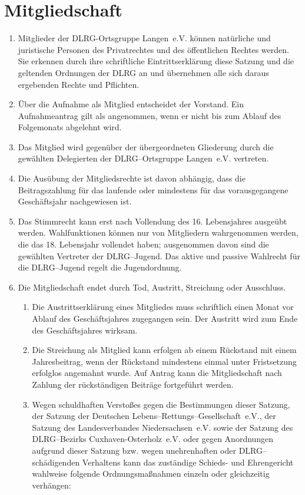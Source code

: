 \documentclass[%
12pt, %
a4paper, %
headsepline, %
footsepline, %
parskip, %
headings=normal, %
]{scrartcl}
\begin{document}
\section{Mitgliedschaft}
\label{sec:mitgliedschaft}
\begin{enumerate}
    \item Mitglieder der DLRG-Ortsgruppe Langen~e.V. können natürliche und juristische Personen des Privatrechtes und des öffentlichen Rechtes werden. Sie erkennen durch ihre schriftliche Eintrittserklärung diese Satzung und die geltenden Ordnungen der DLRG an und übernehmen alle sich daraus ergebenden Rechte und Pflichten.
    \item Über die Aufnahme als Mitglied entscheidet der Vorstand. Ein Aufnahmeantrag gilt als angenommen, wenn er nicht bis zum Ablauf des Folgemonats abgelehnt wird.
    \item Das Mitglied wird gegenüber der übergeordneten Gliederung durch die gewählten Delegierten der DLRG--Ortsgruppe Langen~e.V. vertreten.
    \item Die Ausübung der Mitgliedsrechte ist davon abhängig, dass die Beitragszahlung für das laufende oder mindestens für das vorausgegangene Geschäftsjahr nachgewiesen ist.
    \item Das Stimmrecht kann erst nach Vollendung des 16. Lebensjahres ausgeübt werden. Wahlfunktionen können nur von Mitgliedern wahrgenommen werden, die das 18. Lebensjahr vollendet haben; ausgenommen davon sind die gewählten Vertreter der DLRG--Jugend. Das aktive und passive Wahlrecht für die DLRG--Jugend regelt die Jugendordnung.
    \item Die Mitgliedschaft endet durch Tod, Austritt, Streichung oder Ausschluss.\begin{enumerate}[noitemsep]
        \item Die Austrittserklärung eines Mitgliedes muss schriftlich einen Monat vor Ablauf des Geschäftsjahres zugegangen sein. Der Austritt wird zum Ende des Geschäftsjahres wirksam.
        \item Die Streichung als Mitglied kann erfolgen ab einem Rückstand mit einem Jahresbeitrag, wenn der Rückstand mindestens einmal unter Fristsetzung erfolglos angemahnt wurde. Auf Antrag kann die Mitgliedschaft nach Zahlung der rückständigen Beiträge fortgeführt werden.
        \item Wegen schuldhaften Verstoßes gegen die Bestimmungen dieser Satzung, der Satzung der Deutschen Lebens--Rettungs--Gesellschaft~e.V., der Satzung des Landesverbandes Niedersachsen~e.V. sowie der Satzung des DLRG--Bezirks Cuxhaven-Osterholz~e.V. oder gegen Anordnungen aufgrund dieser Satzung bzw. wegen unehrenhaften oder DLRG--schädigenden Verhaltens kann das zuständige Schieds- und Ehrengericht wahlweise folgende Ordnungsmaßnahmen einzeln oder gleichzeitig verhängen:\begin{enumerate}

\end{enumerate}
\end{enumerate}
\end{enumerate}
\end{document}
